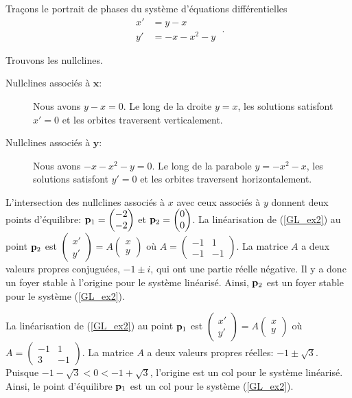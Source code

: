 {\begin{egg}
Traçons le portrait de phases du système d'équations différentielles
\begin{equation} \label{GL_ex2}
\begin{split}
x' &= y - x \\
y' &= -x - x^2 - y
\end{split} \; .
\end{equation}

Trouvons les nullclines.
\begin{description}
\item[Nullclines associés à $\mathbf x$:] Nous avons $y-x = 0$.  Le long de
  la droite $y=x$, les solutions satisfont $x' = 0$ et les orbites
  traversent verticalement.
\item[Nullclines associés à $\mathbf y$:] Nous avons $-x-x^2-y=0$.  Le long
  de la parabole $y=-x^2-x$, les solutions satisfont $y' =0$ et les
  orbites traversent horizontalement. 
\end{description}
L'intersection des nullclines associés à $x$ avec ceux associés à $y$
donnent deux points d'équilibre:
$\displaystyle \mathbf{p}_1 = \begin{pmatrix} -2 \\ -2 \end{pmatrix}$ et
$\displaystyle \mathbf{p}_2 = \begin{pmatrix} 0 \\ 0 \end{pmatrix}$.
La linéarisation de (\ref{GL_ex2}) au point $\mathbf{p}_2$ est
$\begin{pmatrix} x'\\ y' \end{pmatrix} = A
\begin{pmatrix} x\\ y \end{pmatrix}$ où
$\displaystyle A = \begin{pmatrix} -1 & 1 \\ -1 & -1 \end{pmatrix}$.
La matrice $A$ a deux valeurs propres conjuguées, $-1 \pm i$, qui ont
une partie réelle négative.  Il y a donc un foyer stable à l'origine
pour le système linéarisé.  Ainsi, $\mathbf{p}_2$ est un foyer stable
pour le système (\ref{GL_ex2}).

La linéarisation de (\ref{GL_ex2}) au point $\mathbf{p}_1$ est
$\begin{pmatrix} x'\\ y' \end{pmatrix} = A
\begin{pmatrix} x\\ y \end{pmatrix}$ où
$\displaystyle A = \begin{pmatrix} -1 & 1 \\ 3 & -1 \end{pmatrix}$.
La matrice $A$ a deux valeurs propres réelles: $-1 \pm \sqrt{3}$.
Puisque $-1-\sqrt{3} < 0 < -1+\sqrt{3}$, l'origine est un col pour le
système linéarisé.  Ainsi, le point d'équilibre $\mathbf{p}_1$ est un col
pour le système (\ref{GL_ex2}).


\end{egg}}
